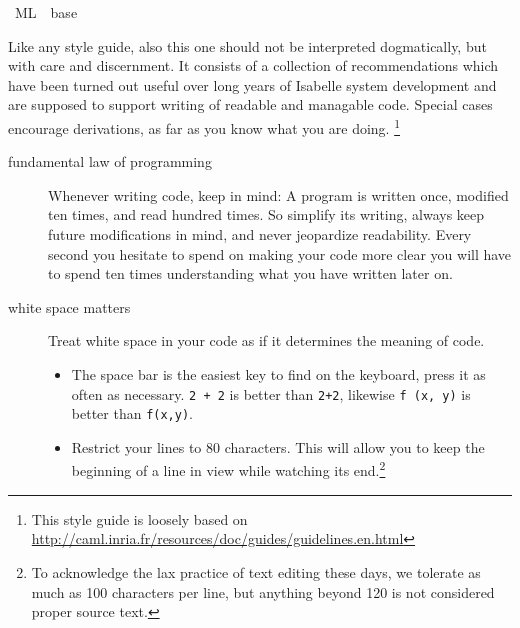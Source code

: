 %
\begin{isabellebody}%
\def\isabellecontext{ML}%
%
\isadelimtheory
\isanewline
\isanewline
%
\endisadelimtheory
%
\isatagtheory
{}\isamarkupfalse%
\ {\isachardoublequoteopen}ML{\isachardoublequoteclose}\ \ base\ %
\endisatagtheory
{\isafoldtheory}%
%
\isadelimtheory
%
\endisadelimtheory
%
\isamarkuptrue%
%
\isamarkuptrue%
%
\begin{isamarkuptext}%
Like any style guide, also this one should not be interpreted dogmatically, but
  with care and discernment.  It consists of a collection of
  recommendations which have been turned out useful over long years of
  Isabelle system development and are supposed to support writing of readable
  and managable code.  Special cases encourage derivations,
  as far as you know what you are doing.
  \footnote{This style guide is loosely based on
  \url{http://caml.inria.fr/resources/doc/guides/guidelines.en.html}}

  \begin{description}

    \item[fundamental law of programming]
      Whenever writing code, keep in mind: A program is
      written once, modified ten times, and read
      hundred times.  So simplify its writing,
      always keep future modifications in mind,
      and never jeopardize readability.  Every second you hesitate
      to spend on making your code more clear you will
      have to spend ten times understanding what you have
      written later on.

    \item[white space matters]
      Treat white space in your code as if it determines
      the meaning of code.

      \begin{itemize}

        \item The space bar is the easiest key to find on the keyboard,
          press it as often as necessary. \verb|2 + 2| is better
          than \verb|2+2|, likewise \verb|f (x, y)| is
          better than \verb|f(x,y)|.

        \item Restrict your lines to 80 characters.  This will allow
          you to keep the beginning of a line in view while watching
          its end.\footnote{To acknowledge the lax practice of
          text editing these days, we tolerate as much as 100
          characters per line, but anything beyond 120 is not
          considered proper source text.}


\end{itemize}
\end{description}
\end{isamarkuptext}
\end{isabellebody}

